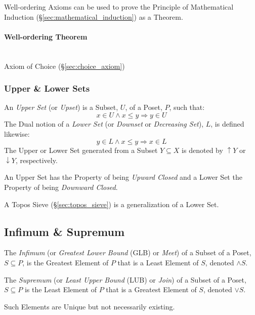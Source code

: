 Well-ordering Axioms can be used to prove the Principle of
Mathematical Induction (\S\ref{sec:mathematical_induction}) as a
Theorem.


\paragraph{Well-ordering Theorem}\label{sec:wellorder_theorem}
\hfill \\

Axiom of Choice (\S\ref{sec:choice_axiom})



\subsubsection{Upper \& Lower Sets}\label{sec:upper_lower}

An \emph{Upper Set} (or \emph{Upset}) is a Subset, $U$, of a Poset,
$P$, such that:
\[
  x \in U \wedge x \leq y \Rightarrow y \in U
\]
The Dual notion of a \emph{Lower Set} (or \emph{Downset} or
\emph{Decreasing Set}), $L$, is defined likewise:
\[
  y \in L \wedge x \leq y \Rightarrow x \in L
\]
The Upper or Lower Set generated from a Subset $Y \subseteq X$ is
denoted by $\uparrow Y$ or $\downarrow Y$, respectively.

An Upper Set has the Property of being \emph{Upward Closed} and a
Lower Set the Property of being \emph{Downward Closed}.

A Topos Sieve (\S\ref{sec:topos_sieve}) is a generalization of a Lower
Set.



\subsection{Infimum \& Supremum}\label{sec:glb_lub}

The \emph{Infimum} (or \emph{Greatest Lower Bound} (GLB) or
\emph{Meet}) of a Subset of a Poset, $S \subseteq P$, is the Greatest
Element of $P$ that is a Least Element of $S$, denoted $\wedge S$.

The \emph{Supremum} (or \emph{Least Upper Bound} (LUB) or \emph{Join})
of a Subset of a Poset, $S \subseteq P$ is the Least Element of $P$
that is a Greatest Element of $S$, denoted $\vee S$.

Such Elements are Unique but not necessarily existing.

